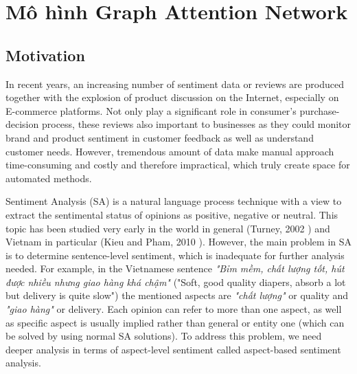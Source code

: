 \chapter{Mô hình Graph Attention Network}
\label{chap:gat-architecture}






\section{Motivation}

In recent years, an increasing number of sentiment data or reviews are produced together with the explosion of product discussion on the Internet, especially on E-commerce platforms. Not only play a significant role in consumer's purchase-decision process, these reviews also important to businesses as they could monitor brand and product sentiment in customer feedback as well as understand customer needs. However, tremendous amount of data make manual approach time-consuming and costly and therefore impractical, which truly create space for automated methods.

Sentiment Analysis (SA) is a natural language process technique with a view to extract the sentimental status of opinions as positive, negative or neutral. This topic has been studied very early in the world in general (Turney, 2002 \cite{turney2002thumbs}) and Vietnam in particular (Kieu and Pham, 2010 \cite{kieu2010sentiment}). However, the main problem in SA is to determine sentence-level sentiment, which is inadequate for further analysis needed. For example, in the Vietnamese sentence \foreignlanguage{vietnamese}{\emph{"Bỉm mềm, chất lượng tốt, hút được nhiều nhưng giao hàng khá chậm"} ("Soft, good quality diapers, absorb a lot but delivery is quite slow") the mentioned aspects are \emph{"chất lượng"} or quality and \emph{"giao hàng"} or delivery}. Each opinion can refer to more than one aspect, as well as specific aspect is usually implied rather than general or entity one (which can be solved by using normal SA solutions). To address this problem, we need deeper analysis in terms of aspect-level sentiment called aspect-based sentiment analysis.


